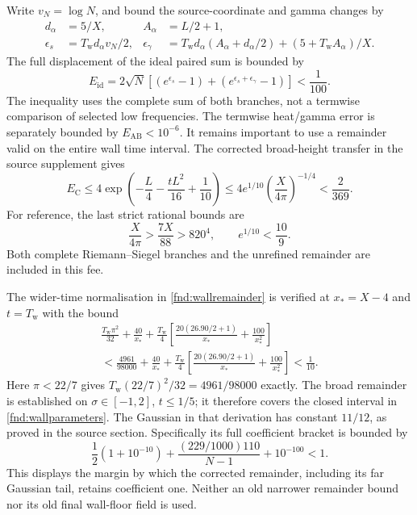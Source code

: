 \documentclass[11pt,a4paper]{article}
\theoremstyle{definition}
\theoremstyle{remark}
\begin{document}
Write $v_N=\log N$, and bound the source-coordinate and gamma changes by
\begin{align}
 d_\alpha&=5/X,& A_\alpha&=L/2+1,\\
 \epsilon_s&=T_{\mathrm w}d_\alpha v_N/2,&
 \epsilon_\gamma&=T_{\mathrm w}d_\alpha
                   (A_\alpha+d_\alpha/2)
                     +(5+T_{\mathrm w}A_\alpha)/X.
 \label{fnd:walldrift}
\end{align}
The full displacement of the ideal paired sum is bounded by
\begin{equation}
 E_{\mathrm{id}}=2\sqrt N
       \left[(e^{\epsilon_s}-1)
                   +(e^{\epsilon_s+\epsilon_\gamma}-1)\right]
 <\frac1{100}.
 \label{fnd:idealerror}
\end{equation}
The inequality uses the complete sum of both branches, not a termwise
comparison of selected low frequencies. The termwise heat/gamma error is
separately bounded by $E_{\mathrm{AB}}<10^{-6}$. It remains important to
use a remainder valid on the entire wall time interval. The corrected
broad-height transfer in the source supplement gives
\begin{equation}
 E_{\mathrm C}
 \leq4\exp\left(-\frac L4-\frac{tL^2}{16}+\frac1{10}\right)
 \leq4e^{1/10}\left(\frac{X}{4\pi}\right)^{-1/4}
 <\frac2{369}.
 \label{fnd:wallremainder}
\end{equation}
For reference, the last strict rational bounds are
\[
 \frac{X}{4\pi}>\frac{7X}{88}>820^4,
 \qquad e^{1/10}<\frac{10}{9}.
\]
Both complete Riemann--Siegel branches and the unrefined remainder are
included in this fee.

The wider-time normalisation in \eqref{fnd:wallremainder} is verified at
$x_*=X-4$ and $t=T_{\mathrm w}$ with the bound
\begin{multline}
 \frac{T_{\mathrm w}\pi^2}{32}
 +\frac{40}{x_*}
 +\frac{T_{\mathrm w}}4
       \left[\frac{20(26.90/2+1)}{x_*}+\frac{100}{x_*^2}\right]\\
 <\frac{4961}{98000}
 +\frac{40}{x_*}
 +\frac{T_{\mathrm w}}4
       \left[\frac{20(26.90/2+1)}{x_*}+\frac{100}{x_*^2}\right]
 <\frac1{10}.
 \label{fnd:wallnormalisation}
\end{multline}
Here $\pi<22/7$ gives
$T_{\mathrm w}(22/7)^2/32=4961/98000$ exactly.
The broad remainder is established on $\sigma\in[-1,2]$, $t\leq1/5$;
it therefore covers the closed interval in \eqref{fnd:wallparameters}.
The Gaussian in that derivation has constant $11/12$, as proved in the
source section. Specifically its full coefficient bracket is bounded by
\[
 \frac12(1+10^{-10})
       +\frac{(229/1000)110}{N-1}+10^{-100}<1.
\]
This displays the margin by which the corrected remainder, including
its far Gaussian tail, retains coefficient one. Neither an old narrower
remainder bound nor its old final wall-floor field is used.
\end{document}
